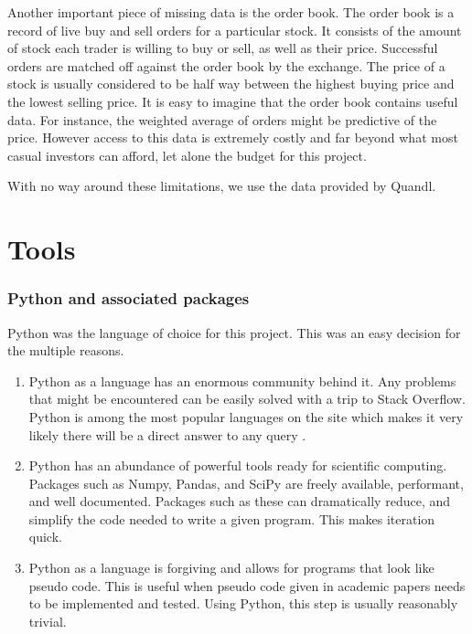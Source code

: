 \documentclass{report}
\begin{document}
Another important piece of missing data is the order book. The order book is a record of live buy and sell orders for a particular stock. It consists of the amount of stock each trader is willing to buy or sell, as well as their price. Successful orders are matched off against the order book by the exchange. The price of a stock is usually considered to be half way between the highest buying price and the lowest selling price. It is easy to imagine that the order book contains useful data. For instance, the weighted average of orders might be predictive of the price. However access to this data is extremely costly and far beyond what most casual investors can afford, let alone the budget for this project.

With no way around these limitations, we use the data provided by Quandl.

\section{Tools}
\subsubsection{Python and associated packages}

Python was the language of choice for this project. This was an easy decision for the multiple reasons.

\begin{enumerate}
  \item Python as a language has an enormous community behind it. Any problems that might be encountered can be easily solved with a trip to Stack Overflow. Python is among the most popular languages on the site which makes it very likely there will be a direct answer to any query \cite{website:redmonk-languages}. 
  
  \item Python has an abundance of powerful tools ready for scientific computing. Packages such as Numpy, Pandas, and SciPy are freely available, performant, and well documented. Packages such as these can dramatically reduce, and simplify the code needed to write a given program. This makes iteration quick.

  \item Python as a language is forgiving and allows for programs that look like pseudo code. This is useful when pseudo code given in academic papers needs to be implemented and tested. Using Python, this step is usually reasonably trivial.

\end{enumerate}
\end{document}
